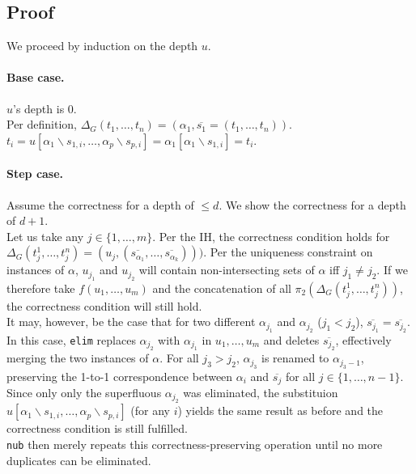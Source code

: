 \documentclass[a4paper, 11pt]{report}
\begin{document}
\subsection{Proof}
We proceed by induction on the depth $u$.

\paragraph{Base case.} $u$'s depth is 0.\\
Per definition, $\Delta_G(t_1,\dots,t_n) = (\alpha_1,\overline{s_1} = (t_1,\dots,t_n))$.\\
$t_i = u[\alpha_1\backslash s_{1,i},\dots,\alpha_p\backslash s_{p,i}] = \alpha_1[\alpha_1\backslash s_{1,i}] = t_i$.

\paragraph{Step case.} Assume the correctness for a depth of $\leq d$. We show the correctness for a depth of $d+1$.\\

Let us take any $j \in \{1,\dots,m\}$. Per the IH, the correctness condition holds for $\Delta_G(t_j^1,\dots,t_j^n) = (u_j, (\overline{s_{\alpha_1}},\dots,\overline{s_{\alpha_k}})))$. Per the uniqueness constraint on instances of $\alpha$, $u_{j_1}$ and $u_{j_2}$ will contain non-intersecting sets of $\alpha$ iff $j_1 \neq j_2$. If we therefore take $f(u_1,\dots,u_m)$ and the concatenation of all $\pi_2(\Delta_G(t_j^1,\dots,t_j^n))$, the correctness condition will still hold.\\

It may, however, be the case that for two different $\alpha_{j_1}$ and $\alpha_{j_2}$ ($j_1 < j_2$), $\overline{s_{j_1}} = \overline{s_{j_2}}$. In this case, \texttt{elim} replaces $\alpha_{j_2}$ with $\alpha_{j_1}$ in $u_1,\dots,u_m$ and deletes $\overline{s_{j_2}}$, effectively merging the two instances of $\alpha$. For all $j_3 > j_2$, $\alpha_{j_3}$ is renamed to $\alpha_{j_3 - 1}$, preserving the 1-to-1 correspondence between $\alpha_i$ and $\overline{s_j}$ for all $j \in \{1,\dots,n-1\}$. Since only only the superfluous $\alpha_{j_2}$ was eliminated, the substituion $u[\alpha_1\backslash s_{1,i},\dots,\alpha_p\backslash s_{p,i}]$ (for any $i$) yields the same result as before and the correctness condition is still fulfilled.\\

\texttt{nub} then merely repeats this correctness-preserving operation until no more duplicates can be eliminated.
\end{document}

